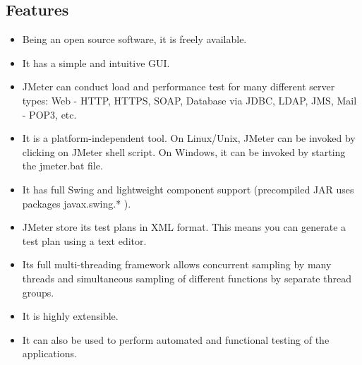 \documentclass[../thesis.tex]{subfiles}
\begin{document}
\subsection*{Features}
\begin{itemize}
  \item Being an open source software, it is freely available.
  \vspace{5mm}
  \item It has a simple and intuitive GUI.
  \vspace{5mm}
  \item JMeter can conduct load and performance test for many different server types: Web - HTTP, HTTPS, SOAP, Database via JDBC, LDAP, JMS, Mail - POP3, etc.
  \vspace{5mm}
  \item It is a platform-independent tool. On Linux/Unix, JMeter can be invoked by clicking on JMeter shell script. On Windows, it can be invoked by starting the jmeter.bat file.
  \vspace{5mm}
  \item It has full Swing and lightweight component support (precompiled JAR uses packages javax.swing.* ).
  \vspace{5mm}
  \item JMeter store its test plans in XML format. This means you can generate a test plan using a text editor.
  \vspace{5mm}
  \item Its full multi-threading framework allows concurrent sampling by many threads and simultaneous sampling of different functions by separate thread groups.
  \vspace{5mm}
  \item It is highly extensible.
  \vspace{5mm}
  \item It can also be used to perform automated and functional testing of the applications.
  \vspace{5mm}
\end{itemize}
\end{document}
